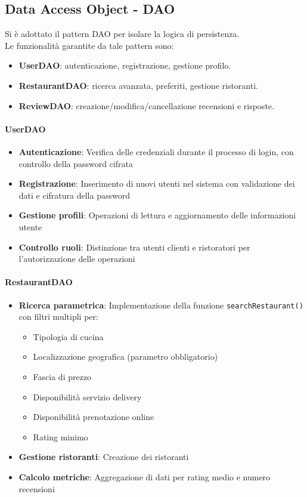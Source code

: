 \subsection{Data Access Object - DAO}
\label{sec:dao}
Si è adottato il pattern DAO per isolare la logica di persistenza.\\
Le funzionalità garantite da tale pattern sono:
\begin{itemize}
  \item \textbf{UserDAO}: autenticazione, registrazione, gestione profilo.
  \item \textbf{RestaurantDAO}: ricerca avanzata, preferiti, gestione ristoranti.
  \item \textbf{ReviewDAO}: creazione/modifica/cancellazione recensioni e risposte.
\end{itemize}

\paragraph{UserDAO}
\begin{itemize}
    \item \textbf{Autenticazione}: Verifica delle credenziali durante il processo di login, con controllo della password cifrata
    \item \textbf{Registrazione}: Inserimento di nuovi utenti nel sistema con validazione dei dati e cifratura della password
    \item \textbf{Gestione profili}: Operazioni di lettura e aggiornamento delle informazioni utente
    \item \textbf{Controllo ruoli}: Distinzione tra utenti clienti e ristoratori per l'autorizzazione delle operazioni
\end{itemize}

\paragraph{RestaurantDAO}
\begin{itemize}
    \item \textbf{Ricerca parametrica}: Implementazione della funzione \texttt{searchRestaurant()} con filtri multipli per:
    \begin{itemize}
        \item Tipologia di cucina
        \item Localizzazione geografica (parametro obbligatorio)
        \item Fascia di prezzo
        \item Disponibilità servizio delivery
        \item Disponibilità prenotazione online
        \item Rating minimo
    \end{itemize}
    \item \textbf{Gestione ristoranti}: Creazione dei ristoranti
    \item \textbf{Calcolo metriche}: Aggregazione di dati per rating medio e numero recensioni
\end{itemize}

